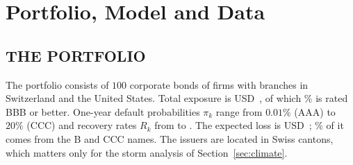 \section{Portfolio, Model and Data}
\label{sec:setting}


\subsection{THE PORTFOLIO}
The portfolio consists of $100$ corporate bonds of firms with branches in Switzerland and the United States. Total exposure is USD~, of which \% is rated BBB or better. One-year default probabilities $\pi_k$ range from $0.01\%$ (AAA) to $20\%$ (CCC) and recovery rates $R_k$ from  to . The expected loss is USD~; \% of it comes from the B and CCC names. The issuers are located in  Swiss cantons, which matters only for the storm analysis of Section~\ref{sec:climate}.

